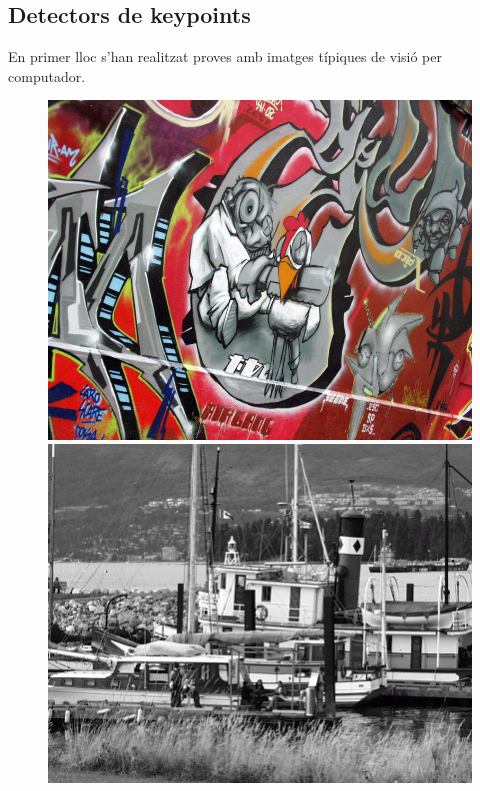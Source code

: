 	\subsection{Detectors de keypoints}
	En primer lloc s'han realitzat proves amb imatges típiques de visió per computador.
		\begin{figure}[!htb]
				\includegraphics[width=\linewidth]{images/experiments/graf3}
				\label{fig:awesome_image1}
			\endminipage\hfill
				\includegraphics[width=\linewidth]{images/experiments/boat}
				\label{fig:awesome_image2}
			\endminipage\hfill

\end{figure}
